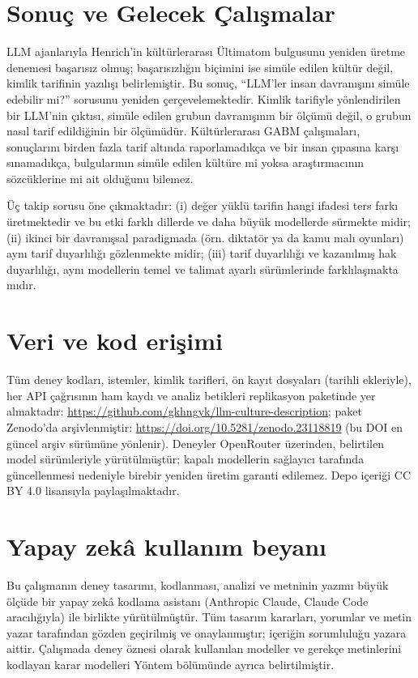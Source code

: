 \documentclass[11pt]{article}
\begin{document}
\section{Sonuç ve Gelecek Çalışmalar}

LLM ajanlarıyla Henrich'in kültürlerarası Ültimatom bulgusunu yeniden üretme denemesi başarısız olmuş; başarısızlığın biçimini ise simüle edilen kültür değil, kimlik tarifinin yazılışı belirlemiştir. Bu sonuç, ``LLM'ler insan davranışını simüle edebilir mi?'' sorusunu yeniden çerçevelemektedir. Kimlik tarifiyle yönlendirilen bir LLM'nin çıktısı, simüle edilen grubun davranışının bir ölçümü değil, o grubun nasıl tarif edildiğinin bir ölçümüdür. Kültürlerarası GABM çalışmaları, sonuçlarını birden fazla tarif altında raporlamadıkça ve bir insan çıpasına karşı sınamadıkça, bulgularının simüle edilen kültüre mi yoksa araştırmacının sözcüklerine mi ait olduğunu bilemez.

Üç takip sorusu öne çıkmaktadır: (i) değer yüklü tarifin hangi ifadesi ters farkı üretmektedir ve bu etki farklı dillerde ve daha büyük modellerde sürmekte midir; (ii) ikinci bir davranışsal paradigmada (örn. diktatör ya da kamu malı oyunları) aynı tarif duyarlılığı gözlenmekte midir; (iii) tarif duyarlılığı ve kazanılmış hak duyarlılığı, aynı modellerin temel ve talimat ayarlı sürümlerinde farklılaşmakta mıdır.


\section*{Veri ve kod erişimi}

Tüm deney kodları, istemler, kimlik tarifleri, ön kayıt dosyaları (tarihli ekleriyle), her API çağrısının ham kaydı ve analiz betikleri replikasyon paketinde yer almaktadır: \url{https://github.com/gkhngyk/llm-culture-description}; paket Zenodo'da arşivlenmiştir: \url{https://doi.org/10.5281/zenodo.23118819} (bu DOI en güncel arşiv sürümüne yönlenir). Deneyler OpenRouter üzerinden, belirtilen model sürümleriyle yürütülmüştür; kapalı modellerin sağlayıcı tarafında güncellenmesi nedeniyle birebir yeniden üretim garanti edilemez. Depo içeriği CC BY 4.0 lisansıyla paylaşılmaktadır.

\section*{Yapay zekâ kullanım beyanı}

Bu çalışmanın deney tasarımı, kodlanması, analizi ve metninin yazımı büyük ölçüde bir yapay zekâ kodlama asistanı (Anthropic Claude, Claude Code aracılığıyla) ile birlikte yürütülmüştür. Tüm tasarım kararları, yorumlar ve metin yazar tarafından gözden geçirilmiş ve onaylanmıştır; içeriğin sorumluluğu yazara aittir. Çalışmada deney öznesi olarak kullanılan modeller ve gerekçe metinlerini kodlayan karar modelleri Yöntem bölümünde ayrıca belirtilmiştir.
\end{document}

